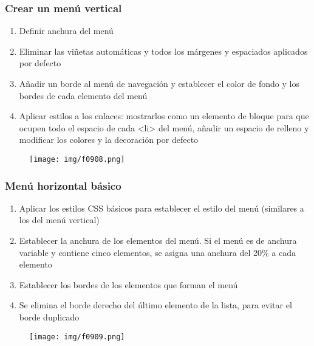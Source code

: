 \begin{frame}
\frametitle{Crear un menú vertical}

\begin{enumerate}
  \item Definir anchura del menú
  \item Eliminar las viñetas automáticas y todos los márgenes y espaciados aplicados por defecto
  \item Añadir un borde al menú de navegación y establecer el color de fondo y los bordes de cada elemento del menú
  \item Aplicar estilos a los enlaces: mostrarlos como un elemento de bloque para que ocupen todo el espacio de cada <li> del menú, añadir un espacio de relleno y modificar los colores y la decoración por defecto
\end{enumerate}


\begin{center}
\begin{figure}[p]
\texttt{[image: img/f0908.png]}
\end{figure}
\end{center}

\end{frame}



\begin{frame}
\frametitle{Menú horizontal básico}

\begin{enumerate}
  \item Aplicar los estilos CSS básicos para establecer el estilo del menú (similares a los del menú vertical)
  \item  Establecer la anchura de los elementos del menú. Si el menú es de anchura variable y contiene cinco elementos, se asigna una anchura del 20\% a cada elemento
  \item Establecer los bordes de los elementos que forman el menú
  \item Se elimina el borde derecho del último elemento de la lista, para evitar el borde duplicado
\end{enumerate}


\begin{center}
\begin{figure}[p]
\texttt{[image: img/f0909.png]}
\end{figure}
\end{center}

\end{frame}




%


